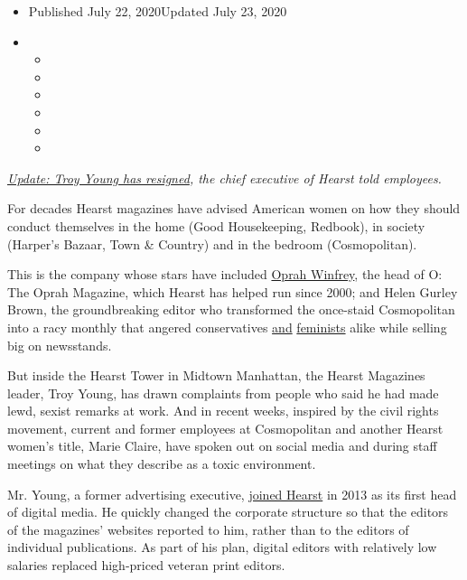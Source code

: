 \begin{itemize}
\item
  Published July 22, 2020Updated July 23, 2020
\item
  \begin{itemize}
  \item
  \item
  \item
  \item
  \item
  \item
  \end{itemize}
\end{itemize}

\href{https://www.nytimes3xbfgragh.onion/2020/07/23/business/troy-young-hearst-magazines.html}{\emph{Update:
Troy Young has resigned}}\emph{, the chief executive of Hearst told
employees.}

For decades Hearst magazines have advised American women on how they
should conduct themselves in the home (Good Housekeeping, Redbook), in
society (Harper's Bazaar, Town \& Country) and in the bedroom
(Cosmopolitan).

This is the company whose stars have included
\href{https://www.nytimes3xbfgragh.onion/2000/04/03/business/winfrey-breaks-new-ground-with-magazine.html}{Oprah
Winfrey}, the head of O: The Oprah Magazine, which Hearst has helped run
since 2000; and Helen Gurley Brown, the groundbreaking editor who
transformed the once-staid Cosmopolitan into a racy monthly that angered
conservatives
\href{https://www.newyorker.com/books/page-turner/owning-your-desire-remembering-helen-gurley-brown}{and}
\href{https://www.nytimes3xbfgragh.onion/1974/08/11/archives/two-faces-of-ms-versus-cosmo.html}{feminists}
alike while selling big on newsstands.

But inside the Hearst Tower in Midtown Manhattan, the Hearst Magazines
leader, Troy Young, has drawn complaints from people who said he had
made lewd, sexist remarks at work. And in recent weeks, inspired by the
civil rights movement, current and former employees at Cosmopolitan and
another Hearst women's title, Marie Claire, have spoken out on social
media and during staff meetings on what they describe as a toxic
environment.

Mr. Young, a former advertising executive,
\href{https://www.nytimes3xbfgragh.onion/2013/05/09/business/media/hearst-magazines-hires-troy-young-as-digital-media-chief.html}{joined
Hearst} in 2013 as its first head of digital media. He quickly changed
the corporate structure so that the editors of the magazines' websites
reported to him, rather than to the editors of individual publications.
As part of his plan, digital editors with relatively low salaries
replaced high-priced veteran print editors.

